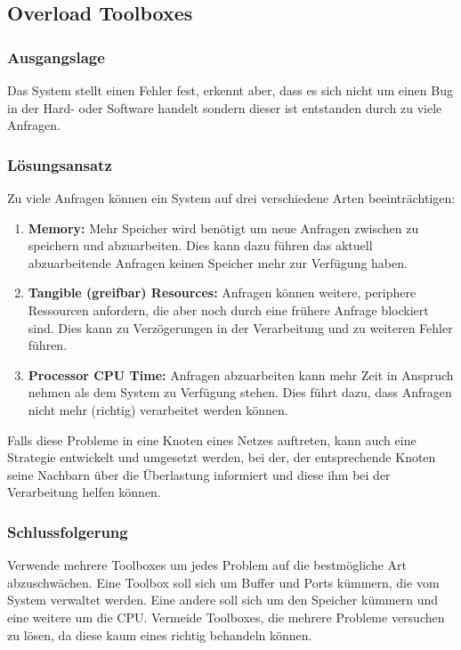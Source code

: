 \subsection{Overload Toolboxes}

\subsubsection*{Ausgangslage}

Das System stellt einen Fehler fest, erkennt aber, dass es sich nicht um einen Bug in der Hard- oder Software handelt sondern dieser ist entstanden durch zu viele Anfragen.

\subsubsection*{Lösungsansatz}

Zu viele Anfragen können ein System auf drei verschiedene Arten beeinträchtigen:
\begin{enumerate}
	\item \textbf{Memory:} Mehr Speicher wird benötigt um neue Anfragen zwischen zu speichern und abzuarbeiten. Dies kann dazu führen das aktuell abzuarbeitende Anfragen keinen Speicher mehr zur Verfügung haben.
	\item \textbf{Tangible (greifbar) Resources:} Anfragen können weitere, periphere Ressourcen anfordern, die aber noch durch eine frühere Anfrage blockiert sind. Dies kann zu Verzögerungen in der Verarbeitung und zu weiteren Fehler führen.
	\item \textbf{Processor CPU Time:} Anfragen abzuarbeiten kann mehr Zeit in Anspruch nehmen als dem System zu Verfügung stehen. Dies führt dazu, dass Anfragen nicht mehr (richtig) verarbeitet werden können.
\end{enumerate}

Falls diese Probleme in eine Knoten eines Netzes auftreten, kann auch eine Strategie entwickelt und umgesetzt werden, bei der, der entsprechende Knoten seine Nachbarn über die Überlastung informiert und diese ihm bei der Verarbeitung helfen können.

\subsubsection*{Schlussfolgerung}

Verwende mehrere Toolboxes um jedes Problem auf die bestmögliche Art abzuschwächen. Eine Toolbox soll sich um Buffer und Ports kümmern, die vom System verwaltet werden. Eine andere soll sich um den Speicher kümmern und eine weitere um die CPU. Vermeide Toolboxes, die mehrere Probleme versuchen zu lösen, da diese kaum eines richtig behandeln können.

